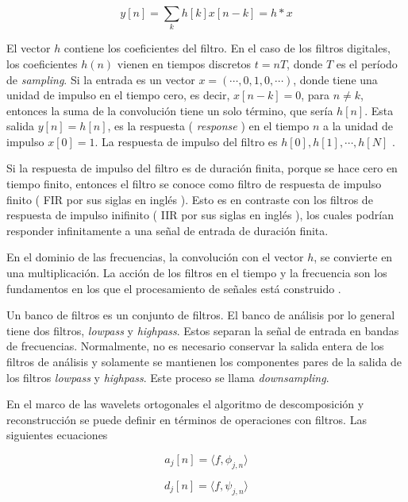 \begin{equation}
	y[n] = \sum_{k} h[k]x[n-k] = h * x
\end{equation}

El vector $h$ contiene los coeficientes del filtro. En el caso de los filtros digitales, los 
coeficientes $h(n)$ vienen en tiempos discretos $t=nT$, donde $T$ es el período de \textit{sampling}. 
Si la entrada es un vector $x=(\cdots,0,1,0,\cdots)$, donde tiene una unidad de impulso en el tiempo cero,
es decir, $x[n-k]=0$, para $n \neq k$, entonces la suma de la convolución tiene un solo término, que sería
$h[n]$. Esta salida $y[n]=h[n]$, es la respuesta ( \textit{response} ) en el tiempo $n$ a la unidad de impulso
$x[0]=1$. La respuesta de impulso del filtro es $h[0],h[1],\cdots,h[N]$ \cite{Gilbert95}.

Si la respuesta de impulso del filtro es de duración finita, porque se hace cero en tiempo finito, entonces
el filtro se conoce como filtro de respuesta de impulso finito ( FIR por sus siglas en inglés ). Esto es en contraste con los
filtros de respuesta de impulso  inifinito ( IIR por sus siglas en inglés ), los cuales podrían responder 
infinitamente a una señal de entrada de duración finita.

En el dominio de las frecuencias, la convolución con el vector $h$, se convierte en una multiplicación. La 
acción de los filtros en el tiempo y la frecuencia son los fundamentos en los que el procesamiento de señales
está construido \cite{Gilbert95}.

Un banco de filtros es un conjunto de filtros. El banco de análisis por lo general tiene dos filtros, \textit{lowpass}
y \textit{highpass}. Estos separan la señal de entrada en bandas de frecuencias. Normalmente, no es necesario
conservar la salida entera de los filtros de análisis y solamente se mantienen los componentes pares de la salida
de los filtros \textit{lowpass} y \textit{highpass}. Este proceso se llama \textit{downsampling}. 

En el marco de las wavelets ortogonales el algoritmo de descomposición y reconstrucción se puede definir
en términos de operaciones con filtros. Las siguientes ecuaciones \cite{Mallat2008}

\begin{equation}
	a_j[n] = \langle f,\phi_{j,n} \rangle
\end{equation}

\begin{equation}
	d_j[n] = \langle f,\psi_{j,n} \rangle
\end{equation}

